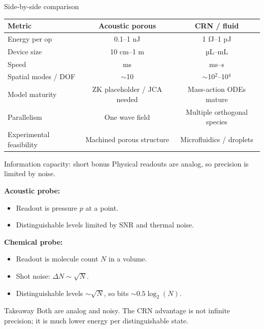 \documentclass[aspectratio=169,11pt]{beamer}
\begin{document}
\begin{frame}{Side-by-side comparison}
  \small
  \begin{center}
    \footnotesize
    \begin{tabular}{lcc}
      \toprule
      Metric & Acoustic porous & CRN / fluid \\
      \midrule
      Energy per op & 0.1--1 nJ & 1 fJ--1 pJ \\
      Device size & 10 cm--1 m & µL--mL \\
      Speed & ms & ms--s \\
      Spatial modes / DOF & $\sim$10 & $\sim$10$^2$--10$^4$ \\
      Model maturity & ZK placeholder / JCA needed & Mass-action ODEs mature \\
      Parallelism & One wave field & Multiple orthogonal species \\
      Experimental feasibility & Machined porous structure & Microfluidics / droplets \\
      \bottomrule
    \end{tabular}
  \end{center}
\end{frame}

\begin{frame}{Information capacity: short bonus}
  \small
  Physical readouts are analog, so precision is limited by noise.

  \vspace{0.2cm}
  \textbf{Acoustic probe:}
  \begin{itemize}
    \item Readout is pressure $p$ at a point.
    \item Distinguishable levels limited by SNR and thermal noise.
  \end{itemize}

  \vspace{0.2cm}
  \textbf{Chemical probe:}
  \begin{itemize}
    \item Readout is molecule count $N$ in a volume.
    \item Shot noise: $\Delta N \sim \sqrt{N}$.
    \item Distinguishable levels $\sim \sqrt{N}$, so bits $\sim 0.5 \log_2(N)$.
  \end{itemize}

  \begin{block}{Takeaway}
    Both are analog and noisy. The CRN advantage is not infinite precision; it is much lower energy per distinguishable state.
  \end{block}
\end{frame}
\end{document}
